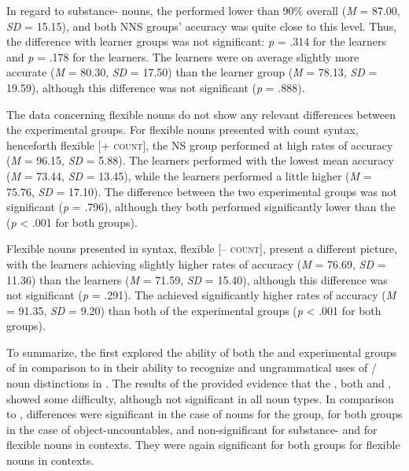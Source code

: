 \documentclass[output=paper]{langsci/langscibook}
\begin{document}
In regard to substance- nouns, the  performed lower than 90\% overall (\textit{M} = 87.00, \textit{SD} = 15.15), and both NNS groups’ accuracy was quite close to this level. Thus, the difference with learner groups was not significant: \textit{p} = .314 for the  learners and \textit{p} = .178 for the  learners. The  learners were on average slightly more accurate (\textit{M} = 80.30, \textit{SD} = 17.50) than the  learner group (\textit{M} = 78.13, \textit{SD} = 19.59), although this difference was not significant (\textit{p} = .888). 

\newpage 
The data concerning flexible nouns do not show any relevant differences between the experimental groups. For flexible nouns presented with count syntax, henceforth flexible [\textsc{+ count}], the NS group performed at high rates of accuracy (\textit{M} = 96.15, \textit{SD} = 5.88). The  learners performed with the lowest mean accuracy (\textit{M} = 73.44, \textit{SD} = 13.45), while the  learners performed a little higher (\textit{M} = 75.76, \textit{SD} = 17.10). The difference between the two experimental groups was not significant (\textit{p} = .796), although they both performed significantly lower than the  (\textit{p} < .001 for both groups).

Flexible nouns presented in  syntax, flexible [\textsc{– count}], present a different picture, with the  learners achieving slightly higher rates of accuracy (\textit{M} = 76.69, \textit{SD} = 11.36) than the  learners (\textit{M} = 71.59, \textit{SD} = 15.40), although this difference was not significant (\textit{p} = .291). The  achieved significantly higher rates of accuracy (\textit{M} = 91.35, \textit{SD} = 9.20) than both of the experimental groups (\textit{p} < .001 for both groups). 

To summarize, the first  explored the  ability of both the  and  experimental groups of  in comparison to  in their ability to recognize  and ungrammatical uses of / noun distinctions in . The results of the  provided evidence that the , both  and , showed some difficulty, although not significant in all noun types. In comparison to , differences were significant in the case of  nouns for the  group, for both groups in the case of object-uncount\-ables, and non-significant for substance- and for flexible nouns in  contexts. They were again significant for both groups for flexible nouns in  contexts. 
\end{document}
